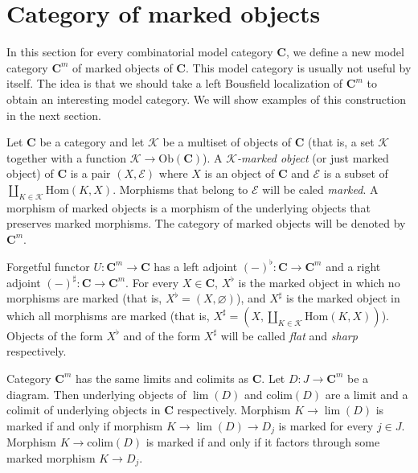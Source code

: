\documentclass[reqno]{amsart}
\theoremstyle{definition}
\theoremstyle{remark}
\newcommand{\cat}[1]{\mathbf{#1}}
\newcommand{\C}{\cat{C}}
\newcommand{\K}{$\mathcal{K}$}
\newcommand{\Hom}{\mathrm{Hom}}
\newcommand{\colim}{\mathrm{colim}}
\numberwithin{figure}{section}
\begin{document}
\section{Category of marked objects}

In this section for every combinatorial model category $\C$, we define a new model category $\C^m$ of marked objects of $\C$.
This model category is usually not useful by itself.
The idea is that we should take a left Bousfield localization of $\C^m$ to obtain an interesting model category.
We will show examples of this construction in the next section.

\begin{defn}
Let $\C$ be a category and let $\mathcal{K}$ be a multiset of objects of $\C$ (that is, a set $\mathcal{K}$ together with a function $\mathcal{K} \to \mathrm{Ob}(\C)$).
A \emph{\K-marked object} (or just marked object) of $\C$ is a pair $(X,\mathcal{E})$
where $X$ is an object of $\C$ and $\mathcal{E}$ is a subset of $\coprod_{K \in \mathcal{K}} \Hom(K,X)$.
Morphisms that belong to $\mathcal{E}$ will be caled \emph{marked}.
A morphism of marked objects is a morphism of the underlying objects that preserves marked morphisms.
The category of marked objects will be denoted by $\C^m$.
\end{defn}

Forgetful functor $U : \C^m \to \C$ has a left adjoint $(-)^\flat : \C \to \C^m$ and a right adjoint $(-)^\sharp : \C \to \C^m$.
For every $X \in \C$, $X^\flat$ is the marked object in which no morphisms are marked (that is, $X^\flat = (X,\varnothing)$),
and $X^\sharp$ is the marked object in which all morphisms are marked (that is, $X^\sharp = (X,\coprod_{K \in \mathcal{K}} \Hom(K,X))$).
Objects of the form $X^\flat$ and of the form $X^\sharp$ will be called \emph{flat} and \emph{sharp} respectively.

Category $\C^m$ has the same limits and colimits as $\C$.
Let $D : J \to \C^m$ be a diagram.
Then underlying objects of $\lim(D)$ and $\colim(D)$ are a limit and a colimit of underlying objects in $\C$ respectively.
Morphism $K \to \lim(D)$ is marked if and only if morphism $K \to \lim(D) \to D_j$ is marked for every $j \in J$.
Morphism $K \to \colim(D)$ is marked if and only if it factors through some marked morphism $K \to D_j$.
\end{document}
